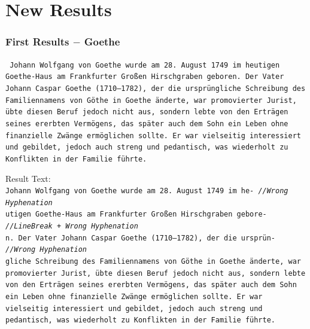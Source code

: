 \documentclass{beamer}
\begin{document}
\section{New Results}

\begin{frame}
\frametitle{First Results $-$ Goethe}
\texttt{\tiny
Johann Wolfgang von Goethe wurde am 28. August 1749 im heutigen \\
Goethe-Haus am Frankfurter Großen Hirschgraben geboren. Der Vater \\
Johann Caspar Goethe (1710–1782), der die ursprüngliche Schreibung des \\
Familiennamens von Göthe in Goethe änderte, war promovierter Jurist, \\
übte diesen Beruf jedoch nicht aus, sondern lebte von den Erträgen \\
seines ererbten Vermögens, das später auch dem Sohn ein Leben ohne \\
finanzielle Zwänge ermöglichen sollte. Er war vielseitig interessiert \\
und gebildet, jedoch auch streng und pedantisch, was wiederholt zu \\
Konflikten in der Familie führte. \\
}

Result Text: \\

\texttt{\scriptsize{J}\tiny ohann Wolfgang von Goethe wurde am 28. August 1749 im he- \hskip 16pt \emph{//Wrong Hyphenation} \\
\scriptsize{u}\tiny tigen Goethe-Haus am Frankfurter Großen Hirschgraben gebore- \hskip 10pt \emph{//LineBreak + Wrong Hyphenation} \\
\scriptsize{n}\tiny . Der Vater Johann Caspar Goethe (1710–1782), der die ursprün- \emph{//Wrong Hyphenation} \\
\scriptsize{g}\tiny liche Schreibung des Familiennamens von Göthe in Goethe änderte, war \\
promovierter Jurist, übte diesen Beruf jedoch nicht aus, sondern lebte \\
von den Erträgen seines ererbten Vermögens, das später auch dem Sohn \\
ein Leben ohne finanzielle Zwänge ermöglichen sollte. Er war \\
vielseitig interessiert und gebildet, jedoch auch streng und \\
pedantisch, was wiederholt zu Konflikten in der Familie führte. \\
}
\end{frame}
\end{document}
